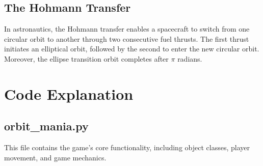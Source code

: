 \documentclass[11pt, a4paper]{article}
\begin{document}
\subsection{The Hohmann Transfer}
In astronautics, the Hohmann transfer enables a spacecraft to switch from one circular orbit to another through two consecutive fuel thrusts. The first thrust initiates an elliptical orbit, followed by the second to enter the new circular orbit. Moreover, the ellipse transition orbit completes after $\pi$ radians.

\section{Code Explanation}

\subsection{orbit\_mania.py}
This file contains the game's core functionality, including object classes, player movement, and game mechanics.
\end{document}
